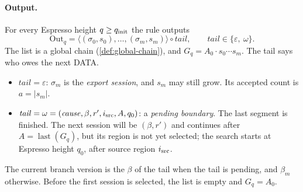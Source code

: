 \documentclass[11pt,a4paper]{article}
\newcommand{\defterm}[1]{\textcolor{rrBlue}{\textit{#1}}}
\begin{document}
\paragraph{Output.}
For every Espresso height $q\ge q_{\rm init}$ the rule outputs
\[
 \mathrm{Out}_q=\big\langle(\sigma_0,s_0),\ldots,(\sigma_m,s_m)\big\rangle
 \circ\mathit{tail},\qquad \mathit{tail}\in\{\varepsilon,\ \omega\}.
\]
The list is a global chain (\cref{def:global-chain}), and
$G_q=A_0\cdot s_0\cdots s_m$. The tail says who owes the next DATA.
\begin{itemize}[itemsep=2pt]
\item $\mathit{tail}=\varepsilon$: $\sigma_m$ is the \defterm{export
session}, and $s_m$ may still grow. Its accepted count is $a=|s_m|$.
\item $\mathit{tail}=\omega=(\mathit{cause},\beta,r',i_{\rm src},A,q_0)$:
a \defterm{pending boundary}. The last segment is finished. The next
session will be $(\beta,r')$ and continues after $A=\operatorname{last}(G_q)$,
but its region is not yet selected; the search starts at Espresso height
$q_0$, after source region $i_{\rm src}$.
\end{itemize}
The current branch version is the $\beta$ of the tail when the tail is
pending, and $\beta_m$ otherwise. Before the first session is selected,
the list is empty and $G_q=A_0$.
\end{document}
